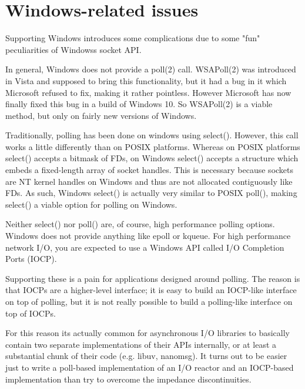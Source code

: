 \chapter{Windows-\/related issues}
\hypertarget{md__c_1_2_users_2namph_2_downloads_2openssl_2openssl-3_82_81_2doc_2designs_2ddd_2_w_i_n_d_o_w_s}{}\label{md__c_1_2_users_2namph_2_downloads_2openssl_2openssl-3_82_81_2doc_2designs_2ddd_2_w_i_n_d_o_w_s}
Supporting Windows introduces some complications due to some "{}fun"{} peculiarities of Windows\textquotesingle{}s socket API.

In general, Windows does not provide a poll(2) call. WSAPoll(2) was introduced in Vista and supposed to bring this functionality, but it had a bug in it which Microsoft refused to fix, making it rather pointless. However Microsoft has now finally fixed this bug in a build of Windows 10. So WSAPoll(2) is a viable method, but only on fairly new versions of Windows.

Traditionally, polling has been done on windows using select(). However, this call works a little differently than on POSIX platforms. Whereas on POSIX platforms select() accepts a bitmask of FDs, on Windows select() accepts a structure which embeds a fixed-\/length array of socket handles. This is necessary because sockets are NT kernel handles on Windows and thus are not allocated contiguously like FDs. As such, Windows select() is actually very similar to POSIX poll(), making select() a viable option for polling on Windows.

Neither select() nor poll() are, of course, high performance polling options. Windows does not provide anything like epoll or kqueue. For high performance network I/O, you are expected to use a Windows API called I/O Completion Ports (IOCP).

Supporting these is a pain for applications designed around polling. The reason is that IOCPs are a higher-\/level interface; it is easy to build an IOCP-\/like interface on top of polling, but it is not really possible to build a polling-\/like interface on top of IOCPs.

For this reason it\textquotesingle{}s actually common for asynchronous I/O libraries to basically contain two separate implementations of their APIs internally, or at least a substantial chunk of their code (e.\+g. libuv, nanomsg). It turns out to be easier just to write a poll-\/based implementation of an I/O reactor and an IOCP-\/based implementation than try to overcome the impedance discontinuities.


